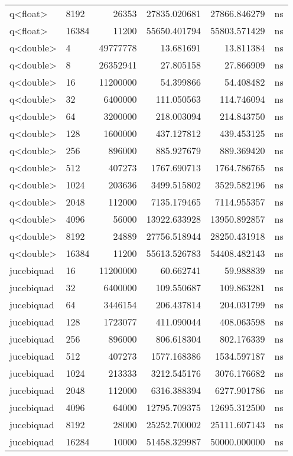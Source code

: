 \begin{tabular}{llrrrl}
q<float> & 8192 & 26353 & 27835.020681 & 27866.846279 & ns \\
q<float> & 16384 & 11200 & 55650.401794 & 55803.571429 & ns \\
q<double> & 4 & 49777778 & 13.681691 & 13.811384 & ns \\
q<double> & 8 & 26352941 & 27.805158 & 27.866909 & ns \\
q<double> & 16 & 11200000 & 54.399866 & 54.408482 & ns \\
q<double> & 32 & 6400000 & 111.050563 & 114.746094 & ns \\
q<double> & 64 & 3200000 & 218.003094 & 214.843750 & ns \\
q<double> & 128 & 1600000 & 437.127812 & 439.453125 & ns \\
q<double> & 256 & 896000 & 885.927679 & 889.369420 & ns \\
q<double> & 512 & 407273 & 1767.690713 & 1764.786765 & ns \\
q<double> & 1024 & 203636 & 3499.515802 & 3529.582196 & ns \\
q<double> & 2048 & 112000 & 7135.179465 & 7114.955357 & ns \\
q<double> & 4096 & 56000 & 13922.633928 & 13950.892857 & ns \\
q<double> & 8192 & 24889 & 27756.518944 & 28250.431918 & ns \\
q<double> & 16384 & 11200 & 55613.526783 & 54408.482143 & ns \\
jucebiquad & 16 & 11200000 & 60.662741 & 59.988839 & ns \\
jucebiquad & 32 & 6400000 & 109.550687 & 109.863281 & ns \\
jucebiquad & 64 & 3446154 & 206.437814 & 204.031799 & ns \\
jucebiquad & 128 & 1723077 & 411.090044 & 408.063598 & ns \\
jucebiquad & 256 & 896000 & 806.618304 & 802.176339 & ns \\
jucebiquad & 512 & 407273 & 1577.168386 & 1534.597187 & ns \\
jucebiquad & 1024 & 213333 & 3212.545176 & 3076.176682 & ns \\
jucebiquad & 2048 & 112000 & 6316.388394 & 6277.901786 & ns \\
jucebiquad & 4096 & 64000 & 12795.709375 & 12695.312500 & ns \\
jucebiquad & 8192 & 28000 & 25252.700002 & 25111.607143 & ns \\
jucebiquad & 16284 & 10000 & 51458.329987 & 50000.000000 & ns \\
\bottomrule
\end{tabular}
